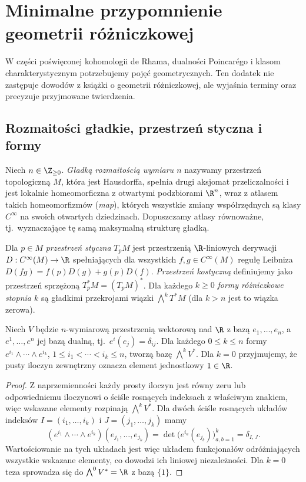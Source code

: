 \chapter{Minimalne przypomnienie geometrii różniczkowej}
\label{ch:dodatek-geometria}

\providecommand{\atlasref}[2]{#2}

W części poświęconej kohomologii de Rhama, dualności Poincarégo i klasom
charakterystycznym potrzebujemy pojęć geometrycznych. Ten dodatek
nie zastępuje dowodów z książki o geometrii różniczkowej, ale wyjaśnia
terminy oraz precyzuje przyjmowane twierdzenia.

\section{Rozmaitości gładkie, przestrzeń styczna i formy}
\begin{definicja}
Niech $n\in\Z_{\ge0}$. \emph{Gładką rozmaitością wymiaru $n$}
nazywamy przestrzeń topologiczną $M$, która jest
Hausdorffa, spełnia drugi aksjomat przeliczalności
i jest lokalnie homeomorficzna z otwartymi podzbiorami
$\R^n$, wraz z atlasem takich homeomorfizmów
(\emph{map}), których wszystkie zmiany współrzędnych
są klasy $C^\infty$ na swoich otwartych dziedzinach.
Dopuszczamy atlasy równoważne, tj.\ wyznaczające tę
samą maksymalną strukturę gładką.

Dla $p\in M$ \emph{przestrzeń styczna} $T_pM$
jest przestrzenią $\R$-liniowych derywacji
$D:C^\infty(M)\to\R$ spełniających dla wszystkich
$f,g\in C^\infty(M)$ regułę Leibniza
$D(fg)=f(p)D(g)+g(p)D(f)$.
\emph{Przestrzeń kostyczną} definiujemy jako
przestrzeń sprzężoną $T_p^*M=(T_pM)^*$.
Dla każdego $k\ge0$ \emph{formy różniczkowe stopnia $k$}
są gładkimi przekrojami wiązki
$\bigwedge^kT^*M$ (dla $k>n$ jest to wiązka zerowa).
\end{definicja}
\begin{stwierdzenie}
Niech $V$ będzie $n$-wymiarową przestrzenią wektorową
nad $\R$ z bazą $e_1,\dots,e_n$,
a $e^1,\dots,e^n$ jej bazą dualną, tj.\
$e^i(e_j)=\delta_{ij}$.
Dla każdego $0\le k\le n$ formy
$e^{i_1}\wedge\cdots\wedge e^{i_k}$,
$1\le i_1<\cdots<i_k\le n$,
tworzą bazę $\bigwedge^k V^*$.
Dla $k=0$ przyjmujemy, że pusty iloczyn
zewnętrzny oznacza element jednostkowy $1\in\R$.
\end{stwierdzenie}
\begin{proof}
Z naprzemienności każdy prosty iloczyn jest równy zeru lub
odpowiedniemu iloczynowi o ściśle rosnących indeksach z właściwym znakiem,
więc wskazane elementy rozpinają $\bigwedge^kV^*$.
Dla dwóch ściśle rosnących układów indeksów
$I=(i_1,\ldots,i_k)$ i $J=(j_1,\ldots,j_k)$
mamy
\[
(e^{i_1}\wedge\cdots\wedge e^{i_k})
(e_{j_1},\ldots,e_{j_k})
=\det\bigl(e^{i_a}(e_{j_b})\bigr)_{a,b=1}^k
=\delta_{I,J}.
\]
Wartościowanie na tych układach jest więc układem
funkcjonałów odróżniających wszystkie wskazane
elementy, co dowodzi ich liniowej niezależności.
Dla $k=0$ teza sprowadza się do
$\bigwedge^0V^*=\R$ z bazą $\{1\}$.
\end{proof}

